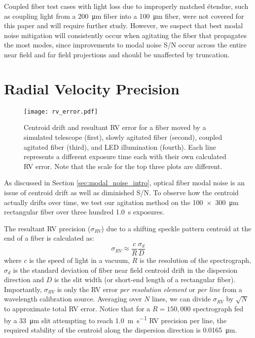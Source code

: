 \documentclass[twocolumn]{emulateapj}
\begin{document}
Coupled fiber test cases with light loss due to improperly matched \'etendue, such as coupling light from a \SI{200}{\micro\meter} fiber into a \SI{100}{\micro\meter} fiber, were not covered for this paper and will require further study. However, we suspect that best modal noise mitigation will consistently occur when agitating the fiber that propagates the most modes, since improvements to modal noise S/N occur across the entire near field and far field projections and should be unaffected by truncation.

\section{Radial Velocity Precision}
\label{sec:rv_precision}

\begin{figure*}
\centering
	\texttt{[image: rv\_error.pdf]}
	\caption{Centroid drift and resultant RV error for a fiber moved by a simulated telescope (first), slowly agitated fiber (second), coupled agitated fiber (third), and LED illumination (fourth). Each line represents a different exposure time each with their own calculated RV error. Note that the scale for the top three plots are different.}
\label{fig:rv_error}
\end{figure*}

As discussed in Section \ref{sec:modal_noise_intro}, optical fiber modal noise is an issue of centroid drift as well as diminished S/N. To observe how the centroid actually drifts over time, we test our agitation method on the \SI{100x300}{\micro\meter} rectangular fiber over three hundred \SI{1.0}{\second} exposures.

The resultant RV precision ($\sigma_{RV}$) due to a shifting speckle pattern centroid at the end of a fiber is calculated as:
\begin{equation}
\sigma_{RV} \approx \frac{c}{R} \frac{\sigma_d}{D}
\label{eq:rv_error}
\end{equation}
where $c$ is the speed of light in a vacuum, $R$ is the resolution of the spectrograph, $\sigma_d$ is the standard deviation of fiber near field centroid drift in the dispersion direction and $D$ is the slit width (or short-end length of a rectangular fiber). Importantly, $\sigma_{RV}$ is only the RV error \textit{per resolution element} or \textit{per line} from a wavelength calibration source. Averaging over $N$ lines, we can divide $\sigma_{RV}$ by $\sqrt{N}$ to approximate total RV error. Notice that for a $R=150,000$ spectrograph fed by a \SI{33}{\micro\meter} slit attempting to reach \SI{1.0}{\meter\per\second} RV precision per line, the required stability of the centroid along the dispersion direction is \SI{0.0165}{\micro\meter}.
\end{document}
